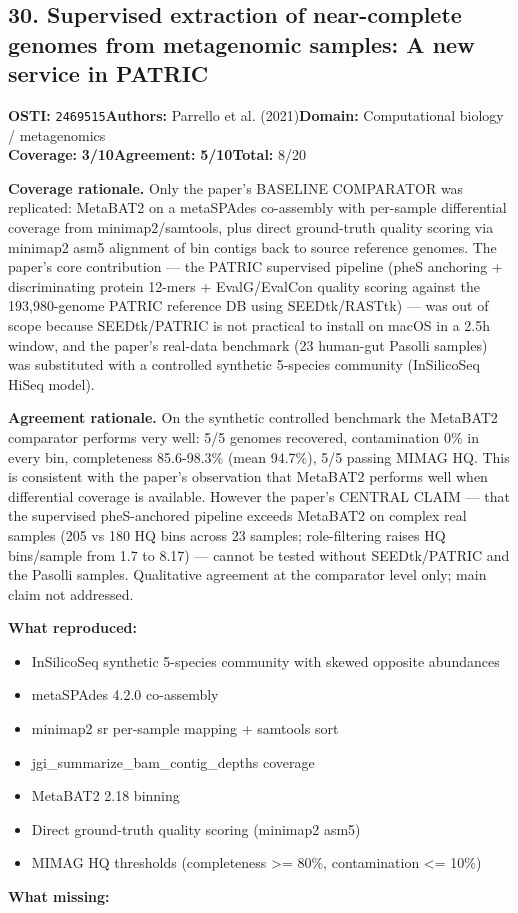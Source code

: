 \documentclass[11pt]{article}
\newcommand{\scorebadge}[2]{\textbf{#1:} \textbf{#2/10}}
\begin{document}
\subsection{30. Supervised extraction of near-complete genomes from metagenomic samples: A new service in PATRIC}
\textbf{OSTI:} \texttt{2469515}\quad\textbf{Authors:} Parrello et al. (2021)\quad\textbf{Domain:} Computational biology / metagenomics\\
\scorebadge{Coverage}{3}\quad\scorebadge{Agreement}{5}\quad\textbf{Total:} 8/20\par\smallskip
\noindent\textbf{Coverage rationale.} Only the paper's BASELINE COMPARATOR was replicated: MetaBAT2 on a metaSPAdes co-assembly with per-sample differential coverage from minimap2/samtools, plus direct ground-truth quality scoring via minimap2 asm5 alignment of bin contigs back to source reference genomes. The paper's core contribution --- the PATRIC supervised pipeline (pheS anchoring + discriminating protein 12-mers + EvalG/EvalCon quality scoring against the 193,980-genome PATRIC reference DB using SEEDtk/RASTtk) --- was out of scope because SEEDtk/PATRIC is not practical to install on macOS in a 2.5h window, and the paper's real-data benchmark (23 human-gut Pasolli samples) was substituted with a controlled synthetic 5-species community (InSilicoSeq HiSeq model).\par
\noindent\textbf{Agreement rationale.} On the synthetic controlled benchmark the MetaBAT2 comparator performs very well: 5/5 genomes recovered, contamination 0\% in every bin, completeness 85.6-98.3\% (mean 94.7\%), 5/5 passing MIMAG HQ. This is consistent with the paper's observation that MetaBAT2 performs well when differential coverage is available. However the paper's CENTRAL CLAIM --- that the supervised pheS-anchored pipeline exceeds MetaBAT2 on complex real samples (205 vs 180 HQ bins across 23 samples; role-filtering raises HQ bins/sample from 1.7 to 8.17) --- cannot be tested without SEEDtk/PATRIC and the Pasolli samples. Qualitative agreement at the comparator level only; main claim not addressed.\par\smallskip
\noindent\textbf{What reproduced:}
\begin{itemize}[leftmargin=1.4em,itemsep=0.2em,topsep=0.2em]
\item InSilicoSeq synthetic 5-species community with skewed opposite abundances
\item metaSPAdes 4.2.0 co-assembly
\item minimap2 sr per-sample mapping + samtools sort
\item jgi\_summarize\_bam\_contig\_depths coverage
\item MetaBAT2 2.18 binning
\item Direct ground-truth quality scoring (minimap2 asm5)
\item MIMAG HQ thresholds (completeness \textgreater{}= 80\%, contamination \textless{}= 10\%)
\end{itemize}\noindent\textbf{What missing:}
\end{document}
